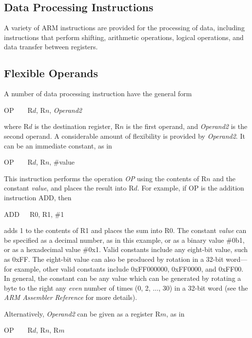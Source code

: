 \documentclass[11pt, twoside, pdftex]{article}
\begin{document}
\subsection{Data Processing Instructions}
\label{sec:processing}

\noindent
A variety of ARM instructions are provided for the processing of data, including 
instructions that perform shifting, arithmetic operations, logical
operations, and data transfer between registers.

\subsection{Flexible Operands}
\label{sec:operand2}

\noindent
A number of data processing instruction have the general form

\begin{center}
OP~~~~R$d$, R$n$, {\it Operand2}
\end{center}
\noindent
where R$d$ is the destination register, R$n$ is the first operand, and {\it Operand2}
is the second operand. A considerable amount of flexibility is provided by {\it Operand2}.
It can be an immediate constant, as in
\begin{center}
OP~~~~R$d$, R$n$, \#value
\end{center}
\noindent
This instruction performs the operation {\it OP} using the contents of R$n$ and the constant
{\it value}, and places the result into R$d$. For example, if OP is the addition instruction ADD,
then
\begin{center}
ADD~~~R0, R1, \#1
\end{center}
\noindent
adds 1 to the contents of R1 and places the sum into R0. The constant {\it value} can be
specified as a decimal number, as in this example, or as a binary value \#0b1, or as
a hexadecimal value \#0x1. Valid constants include any eight-bit value, such as 0xFF. The
eight-bit value can also be produced by rotation in a 32-bit word---for example, other valid 
constants include 0xFF000000, 0xFF0000, and 0xFF00. In general, the constant can be any 
value which can be generated by rotating a byte to the right any {\it even} number of times
(0, 2, $\ldots$, 30) in a 32-bit word (see the {\it ARM Assembler Reference} for more details).

\noindent
Alternatively, {\it Operand2} can be given as a register R$m$, as in
\begin{center}
OP~~~~R$d$, R$n$, R$m$
\end{center}
\end{document}
